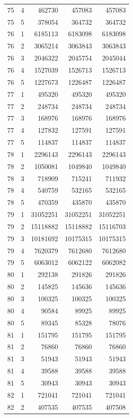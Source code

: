 \begin{longtable}{rrrrr}
75 & 4 & 462730 & 457083 & 457083 \\
75 & 5 & 378054 & 364732 & 364732 \\
76 & 1 & 6185113 & 6183098 & 6183098 \\
76 & 2 & 3065214 & 3063843 & 3063843 \\
76 & 3 & 2046322 & 2045754 & 2045044 \\
76 & 4 & 1527039 & 1526713 & 1526713 \\
76 & 5 & 1227673 & 1226487 & 1226487 \\
77 & 1 & 495320 & 495320 & 495320 \\
77 & 2 & 248734 & 248734 & 248734 \\
77 & 3 & 168976 & 168976 & 168976 \\
77 & 4 & 127832 & 127591 & 127591 \\
77 & 5 & 114837 & 114837 & 114837 \\
78 & 1 & 2296143 & 2296143 & 2296143 \\
78 & 2 & 1050081 & 1049840 & 1049840 \\
78 & 3 & 718909 & 715241 & 711932 \\
78 & 4 & 540759 & 532165 & 532165 \\
78 & 5 & 470359 & 435870 & 435870 \\
79 & 1 & 31052251 & 31052251 & 31052251 \\
79 & 2 & 15118882 & 15118882 & 15116703 \\
79 & 3 & 10181692 & 10175315 & 10175315 \\
79 & 4 & 7620379 & 7612680 & 7612680 \\
79 & 5 & 6063012 & 6062122 & 6062082 \\
80 & 1 & 292138 & 291826 & 291826 \\
80 & 2 & 145825 & 145636 & 145636 \\
80 & 3 & 100325 & 100325 & 100325 \\
80 & 4 & 90584 & 89925 & 89925 \\
80 & 5 & 89345 & 85328 & 78076 \\
81 & 1 & 151795 & 151795 & 151795 \\
81 & 2 & 76860 & 76860 & 76860 \\
81 & 3 & 51943 & 51943 & 51943 \\
81 & 4 & 39588 & 39588 & 39588 \\
81 & 5 & 30943 & 30943 & 30943 \\
82 & 1 & 721041 & 721041 & 721041 \\
82 & 2 & 407535 & 407535 & 407508 \\

\end{longtable}
